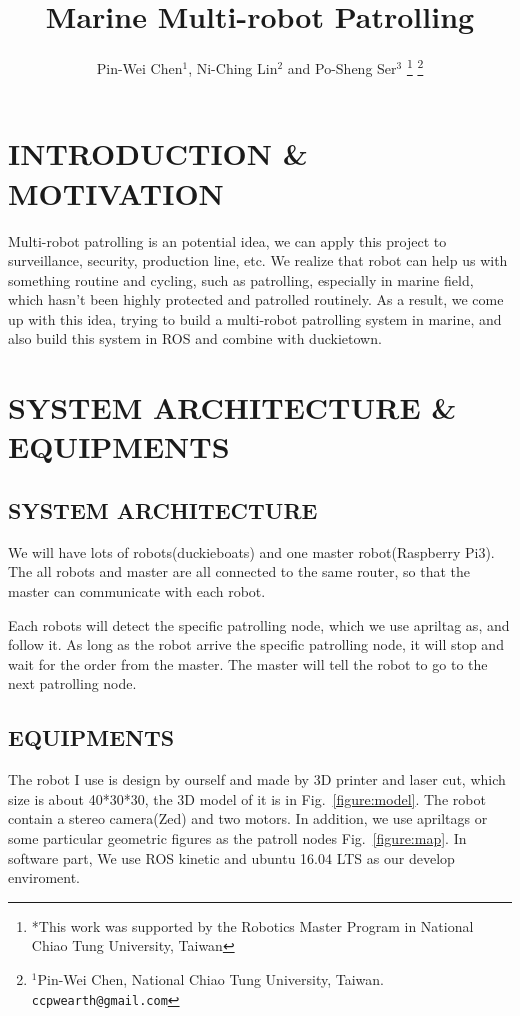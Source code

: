 \documentclass[letterpaper, 10 pt, conference]{ieeeconf}  %
\title{\LARGE \bf
Marine Multi-robot Patrolling
}
\author{Pin-Wei Chen$^{1}$, Ni-Ching Lin$^{2}$ and Po-Sheng Ser$^{3}$ %
\thanks{*This work was supported by the Robotics Master Program in National Chiao Tung University, Taiwan}%
\thanks{$^{1}$Pin-Wei Chen, National Chiao Tung University, Taiwan.		{\tt\small ccpwearth@gmail.com}}%
}
\begin{document}
\maketitle
\thispagestyle{empty}
\pagestyle{empty}


\section{INTRODUCTION \& MOTIVATION}

Multi-robot patrolling is an potential idea, we can apply this project to surveillance, security, production line, etc. We realize that robot can help us with something routine and cycling, such as patrolling, especially in marine field, which hasn't been highly protected and patrolled routinely. As a result, we come up with this idea, trying to build a multi-robot patrolling system in marine, and also build this system in ROS and combine with duckietown.

\section{SYSTEM ARCHITECTURE \& EQUIPMENTS}

\subsection{SYSTEM ARCHITECTURE}

We will have lots of robots(duckieboats) and one master robot(Raspberry Pi3). The all robots and master are all connected to the same router, so that the master can communicate with each robot.

Each robots will detect the specific patrolling node, which we use apriltag as, and follow it. As long as the robot arrive the specific patrolling node, it will stop and wait for the order from the master. The master will tell the robot to go to the next patrolling node.

\subsection{EQUIPMENTS} 

The robot I use is design by ourself and made by 3D printer and laser cut, which size is about 40*30*30, the 3D model of it is in Fig.~\ref{figure:model}. The robot contain a stereo camera(Zed) and two motors. In addition, we use apriltags or some particular geometric figures as the patroll nodes Fig.~\ref{figure:map}. In software part, We use ROS kinetic and ubuntu 16.04 LTS as our develop enviroment.
\end{document}
